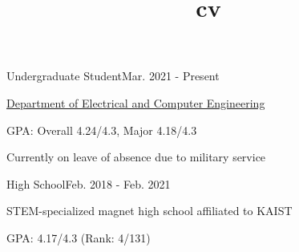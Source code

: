 \documentclass{cv}
\title{cv}
\begin{document}
\cvheader






{Undergraduate Student}{Mar. 2021 - Present}
{
    \item \href{http://ece.snu.ac.kr/en}{Department of Electrical and Computer Engineering}
    \item GPA: Overall 4.24/4.3, Major 4.18/4.3
    \item Currently on leave of absence due to military service
}
{High School}{Feb. 2018 - Feb. 2021}
{
    \item STEM-specialized magnet high school affiliated to KAIST
    \item GPA: 4.17/4.3 (Rank: 4/131)
}
\end{document}
